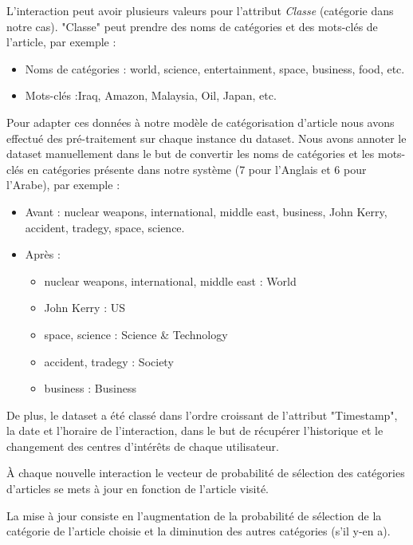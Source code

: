         L'interaction peut avoir plusieurs valeurs pour l'attribut \emph{Classe} (catégorie dans notre cas). "Classe" peut prendre des noms de catégories et des mots-clés de l'article, par exemple :
        \begin{itemize}
            \item Noms de catégories : world, science, entertainment, space, business, food, etc.
            \item Mots-clés :Iraq, Amazon, Malaysia, Oil, Japan, etc.\\ 
        \end{itemize}
        Pour adapter ces données à notre modèle de catégorisation d'article nous avons effectué des pré-traitement sur chaque instance du dataset. Nous avons annoter le dataset manuellement dans le but de convertir les noms de catégories et les mots-clés en catégories présente dans notre système (7 pour l'Anglais et 6 pour l'Arabe), par exemple :
        \begin{itemize}
            \item Avant : nuclear weapons, international, middle east, business, John Kerry, accident, tradegy, space, science.
            \item Après : 
                \begin{itemize}
                    \item {nuclear weapons, international, middle east} : World
                    \item {John Kerry} : US
                    \item {space, science} : Science \& Technology
                    \item {accident, tradegy} : Society
                    \item {business} : Business\\
                \end{itemize}    
        \end{itemize}
        De plus, le dataset a été classé dans l'ordre croissant de l'attribut "Timestamp", la date et l'horaire de l'interaction, dans le but de récupérer l'historique et le changement des centres d’intérêts de chaque utilisateur. 

        À chaque nouvelle interaction le vecteur de probabilité de sélection des catégories d'articles se mets à jour en fonction de l'article visité. 

        La mise à jour consiste en l'augmentation de la probabilité de sélection de la catégorie de l'article choisie et la diminution des autres catégories (s'il y-en a). 

